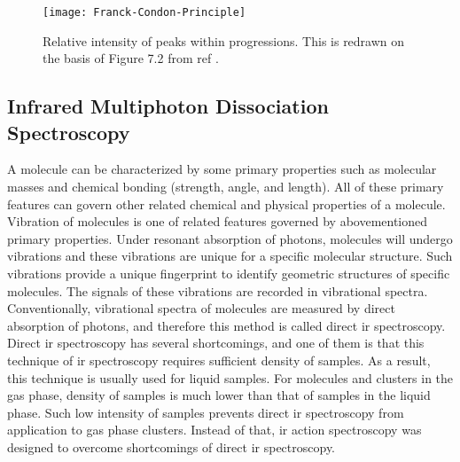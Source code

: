 \begin{refsection}

\begin{figure}[htpb!]
	\centering
	\texttt{[image: Franck-Condon-Principle]}
	\caption{Relative intensity of peaks within progressions. This is redrawn on the basis of Figure 7.2 from ref .}
	\label{fig:c1:Franck-Condon-Principle}
\end{figure}


\FloatBarrier


\subsection{Infrared Multiphoton Dissociation Spectroscopy} 

A molecule can be characterized by some primary properties such as molecular masses and chemical bonding (strength, angle, and length). All of these primary features can govern other related chemical and physical properties of a molecule. Vibration of molecules is one of related features governed by abovementioned primary properties. Under resonant absorption of photons, molecules will undergo vibrations and these vibrations are unique for a specific molecular structure. Such vibrations provide a unique fingerprint to identify geometric structures of specific molecules. The signals of these vibrations are recorded in vibrational spectra. Conventionally, vibrational spectra of molecules are measured by direct absorption of photons, and therefore this method is called direct \acrshort{ir} spectroscopy. Direct \acrshort{ir} spectroscopy has several shortcomings, and one of them is that this technique of \acrshort{ir} spectroscopy requires sufficient density of samples. As a result, this technique is usually used for liquid samples. For molecules and clusters in the gas phase, density of samples is much lower than that of samples in the liquid phase. Such low intensity of samples prevents direct \acrshort{ir} spectroscopy from application to gas phase clusters. Instead of that, \acrshort{ir} action spectroscopy was designed to overcome shortcomings of direct \acrshort{ir} spectroscopy.



\end{refsection}

